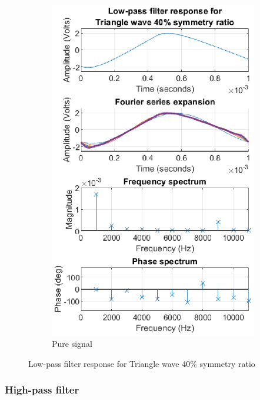 \documentclass[notitlepage, a4paper, 11pt]{article}
\begin{document}
\begin{figure}[H]
\begin{subfigure}{0.45\textwidth}
			\includegraphics[width=\textwidth]{../Matlab/img/RCLPtri40}
			\caption{Pure signal}
		\end{subfigure}
		\caption{Low-pass filter response for Triangle wave 40\% symmetry ratio}
	\end{figure}
	
	\subsubsection{High-pass filter}
\end{document}
